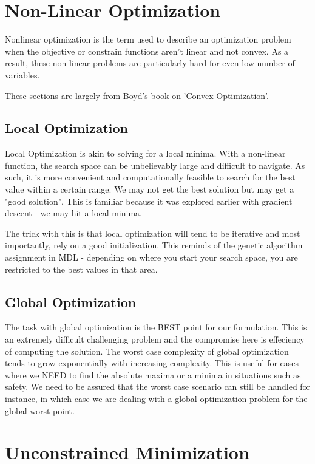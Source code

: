 \section{Non-Linear Optimization}

Nonlinear optimization is the term used to describe an optimization problem when the objective or constrain functions aren't linear and not convex. As a result, these non linear problems are particularly hard for even low number of variables.

These sections are largely from Boyd's book on 'Convex Optimization'.

\subsection{Local Optimization}

Local Optimization is akin to solving for a local minima. With a non-linear function, the search space can be unbelievably large and difficult to navigate. As such, it is more convenient and computationally feasible to search for the best value within a certain range. We may not get the best solution but may get a "good solution". This is familiar because it was explored earlier with gradient descent - we may hit a local minima. 

The trick with this is that local optimization will tend to be iterative and most importantly, rely on a good initialization. This reminds of the genetic algorithm assignment in MDL - depending on where you start your search space, you are restricted to the best values in that area.

\subsection{Global Optimization}

The task with global optimization is the BEST point for our formulation. This is an extremely difficult challenging problem and the compromise here is effeciency of computing the solution. The worst case complexity of global optimization tends to grow exponentially with increasing complexity. This is useful for cases where we NEED to find the absolute maxima or a minima in situations such as safety. We need to be assured that the worst case scenario can still be handled for instance, in which case we are dealing with a global optimization problem for the global worst point.

\section{Unconstrained Minimization}

